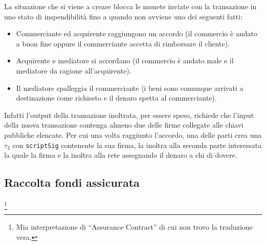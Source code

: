 La situazione che si viene a creare blocca le monete inviate con la transazione in uno stato di inspendibilità fino a quando non avviene uno dei seguenti fatti:
\begin{itemize}
    \item Commerciante ed acquirente raggiungono un accordo (il commercio è andato a buon fine oppure il commerciante accetta di rimborsare il cliente).
    \item Acquirente e mediatore si accordano (il commercio è andato male e il mediatore da ragione all'acquirente).
    \item Il mediatore spalleggia il commerciante (i beni sono comunque arrivati a destinazione come richiesto e il denaro spetta al commerciante).
\end{itemize}
Infatti l'output della transazione inoltrata, per essere speso, richiede che l'input della nuova transazione contenga almeno due delle firme collegate alle chiavi pubbliche elencate. Per cui una volta raggiunto l'accordo, una delle parti crea una $\tau_2$ con \verb|scriptSig| contenente la sua firma, la inoltra alla seconda parte interessata la quale la firma e la inoltra alla rete assegnando il denaro a chi di dovere.

\subsection{Raccolta fondi assicurata}\footnote{Mia interpretazione di ``Assurance Contract'' di cui non trovo la traduzione vera.}

